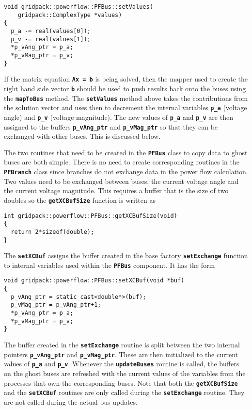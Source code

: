 {
\color{red}
\begin{Verbatim}[fontseries=b]
void gridpack::powerflow::PFBus::setValues(
    gridpack::ComplexType *values)
{
  p_a -= real(values[0]);
  p_v -= real(values[1]);
  *p_vAng_ptr = p_a;
  *p_vMag_ptr = p_v;
}
\end{Verbatim}
}

If the matrix equation \texttt{\textbf{Ax = b}} is being solved, then the mapper used to create the right hand side vector \texttt{\textbf{b}} should be used to push results back onto the buses using the \texttt{\textbf{mapToBus}} method. The \texttt{\textbf{setValues}} method above takes the contributions from the solution vector and uses then to decrement the internal variables \texttt{\textbf{p\_a}} (voltage angle) and \texttt{\textbf{p\_v}} (voltage magnitude). The new values of \texttt{\textbf{p\_a}} and \texttt{\textbf{p\_v}} are then assigned to the buffers \texttt{\textbf{p\_vAng\_ptr}} and \texttt{\textbf{p\_vMag\_ptr}} so that they can be exchanged with other buses. This is discussed below.

The two routines that need to be created in the \texttt{\textbf{PFBus}} class to copy data to ghost buses are both simple. There is no need to create corresponding routines in the \texttt{\textbf{PFBranch}} class since branches do not exchange data in the power flow calculation. Two values need to be exchanged between buses, the current voltage angle and the current voltage magnitude. This requires a buffer that is the size of two doubles so the \texttt{\textbf{getXCBufSize}} function is written as

{
\color{red}
\begin{Verbatim}[fontseries=b]
int gridpack::powerflow::PFBus::getXCBufSize(void)
{
  return 2*sizeof(double);
}
\end{Verbatim}
}

The \texttt{\textbf{setXCBuf}} assigns the buffer created in the base factory \texttt{\textbf{setExchange}} function to internal variables used within the \texttt{\textbf{PFBus}} component. It has the form

{
\color{red}
\begin{Verbatim}[fontseries=b]
void gridpack::powerflow::PFBus::setXCBuf(void *buf)
{
  p_vAng_ptr = static_cast<double*>(buf);
  p_vMag_ptr = p_vAng_ptr+1;
  *p_vAng_ptr = p_a;
  *p_vMag_ptr = p_v;
}
\end{Verbatim}
}

The buffer created in the \texttt{\textbf{setExchange}} routine is split between the two internal pointers \texttt{\textbf{p\_vAng\_ptr}} and \texttt{\textbf{p\_vMag\_ptr}}. These are then initialized to the current values of \texttt{\textbf{p\_a}} and \texttt{\textbf{p\_v}}. Whenever the \texttt{\textbf{updateBuses}} routine is called, the buffers on the ghost buses are refreshed with the current values of the variables from the processes that own the corresponding buses. Note that both the \texttt{\textbf{getXCBufSize}} and the \texttt{\textbf{setXCBuf}} routines are only called during the \texttt{\textbf{setExchange}} routine. They are not called during the actual bus updates.


